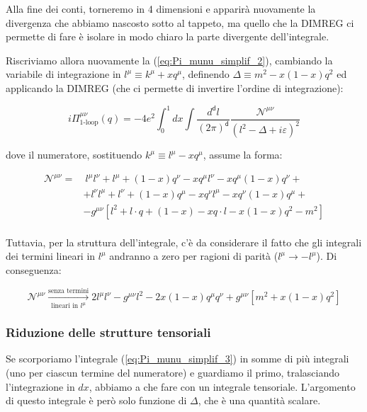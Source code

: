 \documentclass[../main.tex]{subfiles}
\begin{document}
Alla fine dei conti, torneremo in 4 dimensioni e apparirà nuovamente la divergenza che abbiamo nascosto sotto al tappeto, ma quello che la DIMREG ci permette di fare è isolare in modo chiaro la parte divergente dell'integrale.

Riscriviamo allora nuovamente la (\ref{eq:Pi_munu_simplif_2}), cambiando la variabile di integrazione in $l^\mu\equiv k^\mu+xq^\mu$, definendo $\boxed{\Delta \equiv m^2 - x(1-x)q^2}$ ed applicando la DIMREG (che ci permette di invertire l'ordine di integrazione):

\begin{equation}
    \boxed{
    i\Pi^{\mu\nu}_{\text{1-loop}}(q) = - 4e^2\int_0^1dx \int \frac{d^\mathsf{d} l}{(2\pi)^\mathsf{d}} \frac{ \mathscr{N^{\mu\nu}}}{(l^2 - \Delta + i\varepsilon)^2}
    }
    \label{eq:Pi_munu_simplif_3}
\end{equation}

dove il numeratore, sostituendo $k^\mu\equiv l^\mu - xq^\mu$, assume la forma:

\begin{align*}
    \mathscr{N}^{\mu\nu}= &~  l^\mu l^\nu + l^\mu+(1-x)q^\nu - xq^\mu l^\nu - xq^\mu(1-x)q^\nu + \\
                         & + l^\nu l^\mu + l^\nu+(1-x)q^\mu - xq^\nu l^\mu - xq^\nu(1-x)q^\mu + \\
                         & - g^{\mu\nu}[l^2 + l\cdot q+(1-x) - xq\cdot l - x(1-x)q^2 - m^2] \\
\end{align*}

Tuttavia, per la struttura dell'integrale, c'è da considerare il fatto che gli integrali dei termini lineari in $l^\mu$ andranno a zero per ragioni di parità ($l^\mu\rightarrow - l^\mu$).
Di conseguenza:

\begin{equation}
    \mathscr{N}^{\mu\nu} \xrightarrow[\text{lineari in } l^\mu]{\text{senza termini}} 2l^\mu l^\nu - g^{\mu\nu}l^2 - 2x(1-x)q^\mu q^\nu + g^{\mu\nu}[m^2 + x(1-x)q^2]
    \label{eq:numerator_no_lin_terms}
\end{equation}

\subsubsection{Riduzione delle strutture tensoriali}

Se scorporiamo l'integrale (\ref{eq:Pi_munu_simplif_3}) in somme di più integrali (uno per ciascun termine del numeratore) e guardiamo il primo, tralasciando l'integrazione in $dx$, abbiamo a che fare con un integrale tensoriale. L'argomento di questo integrale è però solo funzione di $\Delta$, che è una quantità scalare.
\end{document}
